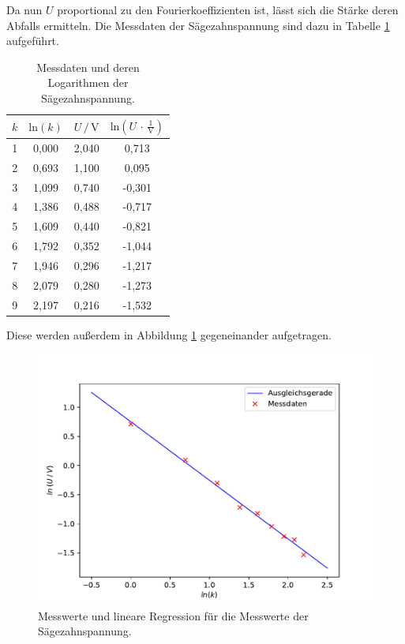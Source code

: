 Da nun $U$ proportional zu den Fourierkoeffizienten ist, lässt sich die
Stärke deren Abfalls ermitteln.
Die Messdaten der Sägezahnspannung sind dazu in Tabelle \ref{tab:Messdaten1} aufgeführt. 

\begin{table}[H]
    \centering
    \caption{Messdaten und deren Logarithmen der Sägezahnspannung.}
    \label{tab:Messdaten1}
    \begin{tabular}{c c c c}
    \toprule
    $k$ & $\text{ln} (k)$ & $U \,/\, \si{\volt}$ & $\text{ln}(U \,\cdot\, \frac{1}{\si{\volt}})$ \\
    \midrule
    1 & 0,000 & 2,040 &  0,713 \\
    2 & 0,693 & 1,100 &  0,095 \\
    3 & 1,099 & 0,740 & -0,301 \\
    4 & 1,386 & 0,488 & -0,717 \\
    5 & 1,609 & 0,440 & -0,821 \\
    6 & 1,792 & 0,352 & -1,044 \\
    7 & 1,946 & 0,296 & -1,217 \\
    8 & 2,079 & 0,280 & -1,273 \\
    9 & 2,197 & 0,216 & -1,532 \\
    \bottomrule
    \end{tabular}
\end{table} 

Diese werden außerdem in Abbildung \ref{fig:Säge} gegeneinander aufgetragen.

\begin{figure}[H]
    \centering
    \includegraphics[scale=1.0]{content/plot1.pdf}
    \caption{Messwerte und lineare Regression für die Messwerte der Sägezahnspannung.}
    \label{fig:Säge}
\end{figure}

